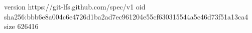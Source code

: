 version https://git-lfs.github.com/spec/v1
oid sha256:bbb6e8a004c6e4726d1ba2ad7ec961204e55cf630315544a5c46d73f51a13ca4
size 626416
